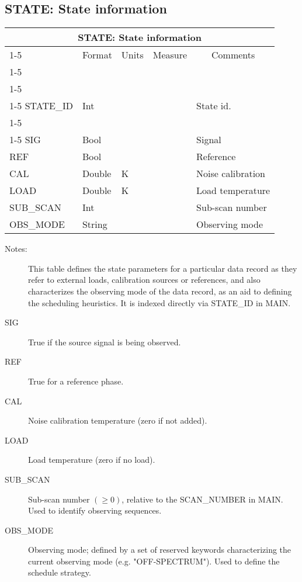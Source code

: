 \documentclass{article}
\newcommand{\defline}[1]{\cline{1-5}
\multicolumn{5}{|l|}{#1} \\
\cline{1-5}}
\newcommand{\definetable}[2]
{
	\vfill\newpage
	\subsection{#1}
        \vspace{0.15in}
        \small
	\begin{tabular}{|l|p{1.25in}|l|p{.9in}|p{1.4in}|}
	\hline
	\multicolumn{5}{|c|}{\bf #1}\\ 
	\cline{1-5}
        \multicolumn{1}{|c|}{Name}&\multicolumn{1}{|c|}{Format}&
        \multicolumn{1}{|c|}{Units}&\multicolumn{1}{|c|}{Measure}&
        \multicolumn{1}{|c|}{Comments}\\
        \cline{1-5}
        #2
        \hline
	\end{tabular}
}
\begin{document}
\definetable{STATE: State information}{
\defline{\bf Columns}
\defline{\em Key}
STATE\_ID & Int & & & State id. \\
\defline{\em Data}  
SIG   &     Bool  &           &        & Signal \\
REF   &     Bool  &           &        & Reference \\
CAL   &     Double &   K      &        & Noise calibration \\
LOAD  &     Double &   K      &        & Load temperature\\
SUB\_SCAN &  Int   &          &        & Sub-scan number\\
OBS\_MODE &  String &         &        & Observing mode\\
}
\begin{description}

\item[Notes:] This table defines the state parameters for a particular
data record as they refer to external loads, calibration sources or
references, and also characterizes the observing mode of the data
record, as an aid to defining the scheduling heuristics. It is indexed
directly via STATE\_ID in MAIN.

\item[SIG] True if the source signal is being observed.

\item[REF] True for a reference phase.

\item[CAL] Noise calibration temperature (zero if not added).

\item[LOAD] Load temperature (zero if no load).

\item[SUB\_SCAN] Sub-scan number $(\geq 0)$, relative to the
SCAN\_NUMBER in MAIN. Used to identify observing sequences.

\item[OBS\_MODE] Observing mode; defined by a set of reserved keywords
characterizing the current observing mode (e.g. "OFF-SPECTRUM"). Used
to define the schedule strategy.

\end{description}
\end{document}
